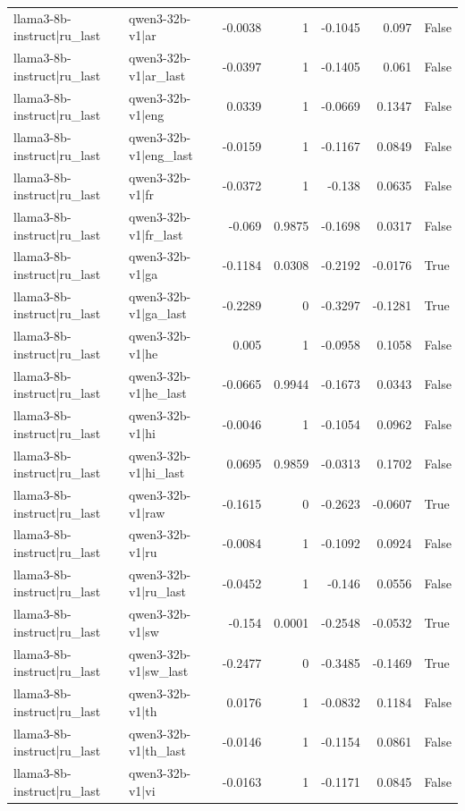 \begin{table}
\begin{tabular}{l l r r r r l}
llama3-8b-instruct|ru_last & qwen3-32b-v1|ar & -0.0038 & 1 & -0.1045 & 0.097 & False \\
llama3-8b-instruct|ru_last & qwen3-32b-v1|ar_last & -0.0397 & 1 & -0.1405 & 0.061 & False \\
llama3-8b-instruct|ru_last & qwen3-32b-v1|eng & 0.0339 & 1 & -0.0669 & 0.1347 & False \\
llama3-8b-instruct|ru_last & qwen3-32b-v1|eng_last & -0.0159 & 1 & -0.1167 & 0.0849 & False \\
llama3-8b-instruct|ru_last & qwen3-32b-v1|fr & -0.0372 & 1 & -0.138 & 0.0635 & False \\
llama3-8b-instruct|ru_last & qwen3-32b-v1|fr_last & -0.069 & 0.9875 & -0.1698 & 0.0317 & False \\
llama3-8b-instruct|ru_last & qwen3-32b-v1|ga & -0.1184 & 0.0308 & -0.2192 & -0.0176 & True \\
llama3-8b-instruct|ru_last & qwen3-32b-v1|ga_last & -0.2289 & 0 & -0.3297 & -0.1281 & True \\
llama3-8b-instruct|ru_last & qwen3-32b-v1|he & 0.005 & 1 & -0.0958 & 0.1058 & False \\
llama3-8b-instruct|ru_last & qwen3-32b-v1|he_last & -0.0665 & 0.9944 & -0.1673 & 0.0343 & False \\
llama3-8b-instruct|ru_last & qwen3-32b-v1|hi & -0.0046 & 1 & -0.1054 & 0.0962 & False \\
llama3-8b-instruct|ru_last & qwen3-32b-v1|hi_last & 0.0695 & 0.9859 & -0.0313 & 0.1702 & False \\
llama3-8b-instruct|ru_last & qwen3-32b-v1|raw & -0.1615 & 0 & -0.2623 & -0.0607 & True \\
llama3-8b-instruct|ru_last & qwen3-32b-v1|ru & -0.0084 & 1 & -0.1092 & 0.0924 & False \\
llama3-8b-instruct|ru_last & qwen3-32b-v1|ru_last & -0.0452 & 1 & -0.146 & 0.0556 & False \\
llama3-8b-instruct|ru_last & qwen3-32b-v1|sw & -0.154 & 0.0001 & -0.2548 & -0.0532 & True \\
llama3-8b-instruct|ru_last & qwen3-32b-v1|sw_last & -0.2477 & 0 & -0.3485 & -0.1469 & True \\
llama3-8b-instruct|ru_last & qwen3-32b-v1|th & 0.0176 & 1 & -0.0832 & 0.1184 & False \\
llama3-8b-instruct|ru_last & qwen3-32b-v1|th_last & -0.0146 & 1 & -0.1154 & 0.0861 & False \\
llama3-8b-instruct|ru_last & qwen3-32b-v1|vi & -0.0163 & 1 & -0.1171 & 0.0845 & False \\

\end{tabular}
\end{table}
